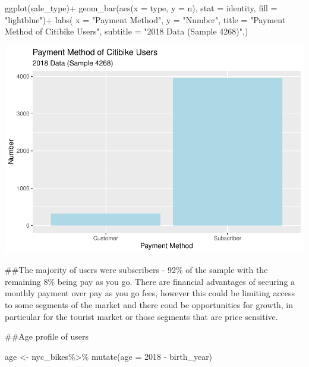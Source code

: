 \documentclass[
]{article}
\newenvironment{Shaded}{\begin{snugshade}}{\end{snugshade}}
\newcommand{\AttributeTok}[1]{\textcolor[rgb]{0.77,0.63,0.00}{#1}}
\newcommand{\DecValTok}[1]{\textcolor[rgb]{0.00,0.00,0.81}{#1}}
\newcommand{\FunctionTok}[1]{\textcolor[rgb]{0.00,0.00,0.00}{#1}}
\newcommand{\NormalTok}[1]{#1}
\newcommand{\OtherTok}[1]{\textcolor[rgb]{0.56,0.35,0.01}{#1}}
\newcommand{\SpecialCharTok}[1]{\textcolor[rgb]{0.00,0.00,0.00}{#1}}
\newcommand{\StringTok}[1]{\textcolor[rgb]{0.31,0.60,0.02}{#1}}
\begin{document}
\begin{Shaded}
\begin{Highlighting}[]
\FunctionTok{ggplot}\NormalTok{(sale\_type)}\SpecialCharTok{+}
  \FunctionTok{geom\_bar}\NormalTok{(}\FunctionTok{aes}\NormalTok{(}\AttributeTok{x =}\NormalTok{ type, }\AttributeTok{y =}\NormalTok{ n), }\AttributeTok{stat =} \StringTok{\textquotesingle{}identity\textquotesingle{}}\NormalTok{, }\AttributeTok{fill =} \StringTok{"lightblue"}\NormalTok{)}\SpecialCharTok{+}
 \FunctionTok{labs}\NormalTok{(}
    \AttributeTok{x =} \StringTok{"Payment Method"}\NormalTok{,}
    \AttributeTok{y =} \StringTok{"Number"}\NormalTok{,}
    \AttributeTok{title =} \StringTok{"Payment Method of Citibike Users"}\NormalTok{,}
    \AttributeTok{subtitle =} \StringTok{"2018 Data (Sample 4268)"}\NormalTok{,)}
\end{Highlighting}
\end{Shaded}

\includegraphics{nyc_bikes_presentation_janehogg_files/figure-latex/unnamed-chunk-6-1.pdf}

\#\#The majority of users were subscribers - 92\% of the sample with the
remaining 8\% being pay as you go. There are financial advantages of
securing a monthly payment over pay as you go fees, however this could
be limiting access to some segments of the market and there coud be
opportunities for growth, in particular for the tourist market or those
segments that are price sensitive.

\#\#Age profile of users

\begin{Shaded}
\begin{Highlighting}[]
\NormalTok{ age }\OtherTok{\textless{}{-}}\NormalTok{ nyc\_bikes}\SpecialCharTok{\%\textgreater{}\%}
  \FunctionTok{mutate}\NormalTok{(}\AttributeTok{age =} \DecValTok{2018} \SpecialCharTok{{-}}\NormalTok{ birth\_year)}
\end{Highlighting}
\end{Shaded}
\end{document}
